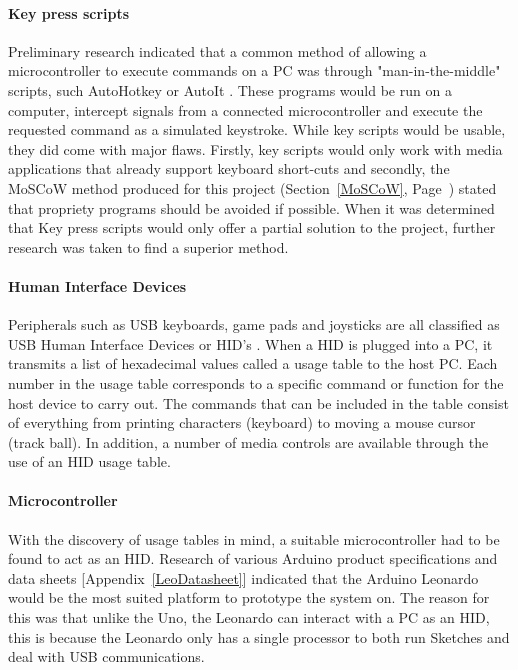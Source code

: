 \documentclass{article}
\begin{document}
			\paragraph{Key press scripts}
			Preliminary research indicated that a common method of allowing a microcontroller to execute commands on a PC was through "man-in-the-middle" scripts, such AutoHotkey \cite{AutoHotkey:online} or AutoIt \cite{AutoIt:online}. These programs would be run on a computer, intercept signals from a connected microcontroller and execute the requested command as a simulated keystroke.
			While key scripts would be usable, they did come with major flaws. Firstly, key scripts would only work with media applications that already support keyboard short-cuts and secondly, the MoSCoW method produced for this project (Section~\ref{MoSCoW}, Page~\pageref{MoSCoW}) stated that propriety programs should be avoided if possible.
			When it was determined that Key press scripts would only offer a partial solution to the project, further research was taken to find a superior method.
			
			\paragraph{Human Interface Devices}
			Peripherals such as USB keyboards, game pads and joysticks are all classified as USB Human Interface Devices or HID's \cite{HID:online} \cite{HIDSiliconLab:online}. When a HID is plugged into a PC, it transmits a list of hexadecimal values called a usage table to the host PC. Each number in the usage table corresponds to a specific command or function for the host device to carry out. The commands that can be included in the table consist of everything from printing characters (keyboard) to moving a mouse cursor (track ball). In addition, a number of media controls are available through the use of an HID usage table. 
							
			\paragraph{Microcontroller}
			With the discovery of usage tables in mind, a suitable microcontroller had to be found to act as an HID. Research of various Arduino product specifications \cite{Uno:online} \cite{Leonardo:online} \cite{LeonardoGuide:online} and data sheets [Appendix~\ref{LeoDatasheet}] indicated that the Arduino Leonardo would be the most suited platform to prototype the system on. The reason for this was that unlike the Uno, the Leonardo can interact with a PC as an HID, this is because the Leonardo only has a single processor to both run Sketches and deal with USB communications.
			
\end{document}
